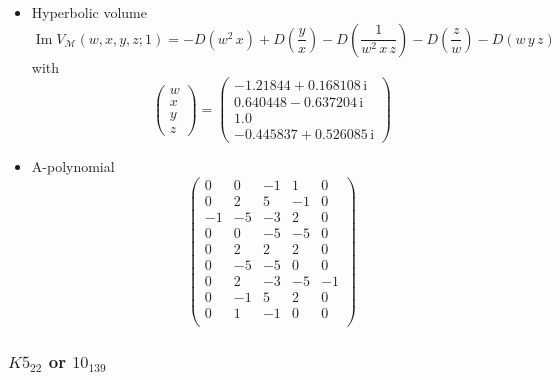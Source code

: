 \documentclass[12pt,reqno]{amsart}
\numberwithin{equation}{section}
\renewcommand{\Im}{\operatorname{Im}}
\newcommand{\I}{\mathrm{i}}
\begin{document}
\begin{itemize}
\item Hyperbolic volume
  \begin{equation*}
    \Im V_{\mathcal{M}}(w, x, y,z; 1)
    =
    - D\left(w^2 \, x\right)
    + D\left(\frac{ y}{x}\right)
    - D\left(\frac{1}{w^2 \, x \, z}\right)
    - D\left(\frac{z}{w}\right)
    - D\left(w \, y \, z\right)
  \end{equation*}
  with
  \begin{equation*}
    \begin{pmatrix}
      w \\ x\\ y \\ z
    \end{pmatrix}
    =
    \begin{pmatrix}
       -1.21844 + 0.168108 \, \I
       \\
       0.640448 - 0.637204 \, \I
       \\
       1.0 \\
       -0.445837 + 0.526085  \, \I
    \end{pmatrix}
  \end{equation*}




\item A-polynomial
  \begin{equation*}
    \begin{pmatrix}
      0 & 0 & -1 & 1 & 0 \\
      0 & 2 & 5 & -1 & 0 \\
      -1 & -5 & -3 & 2 & 0 \\
      0 & 0 & -5 & -5 & 0 \\
      0 & 2 & 2 & 2 & 0 \\
      0 & -5 & -5 & 0 & 0 \\
      0 & 2 & -3 & -5 & -1 \\
      0 & -1 & 5 & 2 & 0 \\
      0 & 1 & -1 & 0 & 0 \\
    \end{pmatrix}
  \end{equation*}
\end{itemize}

\subsubsection{%
 $K5_{22}$ or  $10_{139}$}
\end{document}
